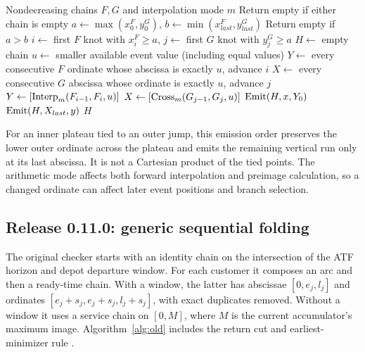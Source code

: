 \begin{algorithm}[htbp]
\caption{Generic event-merge composition $H=F\circ G$}\label{alg:compose}
\begin{algorithmic}[1]
\Require Nondecreasing chains $F,G$ and interpolation mode $m$
\State Return empty if either chain is empty
\State $a\gets\max(x^F_0,y^G_0)$, $b\gets\min(x^F_{last},y^G_{last})$
\State Return empty if $a>b$
\State $i\gets$ first $F$ knot with $x^F_i\geq a$, $j\gets$ first $G$ knot with $y^G_j\geq a$
\State $H\gets$ empty chain
  \State $u\gets$ smaller available event value (including equal values)
  \State $Y\gets$ every consecutive $F$ ordinate whose abscissa is exactly $u$, advance $i$
  \State $X\gets$ every consecutive $G$ abscissa whose ordinate is exactly $u$, advance $j$
    \State $Y\gets[\operatorname{Interp}_m(F_{i-1},F_i,u)]$
  \EndIf
    \State $X\gets[\operatorname{Cross}_m(G_{j-1},G_j,u)]$
  \EndIf
    \State $\operatorname{Emit}(H,x,Y_0)$
  \EndFor
    \State $\operatorname{Emit}(H,X_{last},y)$
  \EndFor
\EndWhile
\State \Return $H$
\end{algorithmic}
\end{algorithm}

For an inner plateau tied to an outer jump, this emission order preserves the lower outer ordinate across the plateau and emits the remaining vertical run only at its last abscissa. It is not a Cartesian product of the tied points. The arithmetic mode affects both forward interpolation and preimage calculation, so a changed ordinate can affect later event positions and branch selection.

\subsection{Release 0.11.0: generic sequential folding}

The original checker starts with an identity chain on the intersection of the ATF horizon and depot departure window. For each customer it composes an arc and then a ready-time chain. With a window, the latter has abscissae $[0,e_j,l_j]$ and ordinates $[e_j+s_j,e_j+s_j,l_j+s_j]$, with exact duplicates removed. Without a window it uses a service chain on $[0,M]$, where $M$ is the current accumulator's maximum image. Algorithm~\ref{alg:old} includes the return cut and earliest-minimizer rule \autocite{mamutChecker0112026}.

